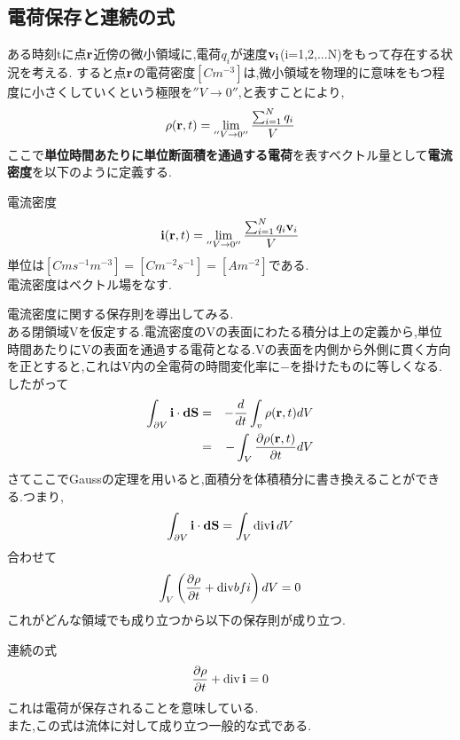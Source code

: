 \documentclass{jsarticle}
\begin{document}
\subsection{電荷保存と連続の式}
ある時刻tに点${\bf r}$近傍の微小領域に,電荷$q_i$が速度${\bf v_i}$(i=1,2,...N)をもって存在する状況を考える.
すると点${\bf r}$の電荷密度$[Cm^{-3}]$は,微小領域を物理的に意味をもつ程度に小さくしていくという極限を$''V \to 0''$,と表すことにより,
\begin{eqnarray*}
\rho({\bf r},t) = \lim_{''V \to 0''} \frac{\sum_{i=1}^{N}q_i}{V}
\end{eqnarray*}
ここで{\bf 単位時間あたりに単位断面積を通過する電荷}を表すベクトル量として{\bf 電流密度}を以下のように定義する.
\begin{itembox}[c]{電流密度}
\begin{eqnarray}
{\bf i}({\bf r},t) = \lim_{''V \to 0''} \frac{\sum_{i=1}^{N}q_i{\bf v}_i}{V}
\end{eqnarray}
単位は$[Cms^{-1}m^{-3}]=[Cm^{-2}s^{-1}]=[Am^{-2}]$である. \\
電流密度はベクトル場をなす.
\end{itembox}
電流密度に関する保存則を導出してみる. \\
ある閉領域Vを仮定する.電流密度のVの表面にわたる積分は上の定義から,単位時間あたりにVの表面を通過する電荷となる.Vの表面を内側から外側に貫く方向を正とすると,これはV内の全電荷の時間変化率に$-$を掛けたものに等しくなる.したがって \\
\begin{eqnarray*}
\int_{\partial V}^{}{\bf i} \cdot {\bf dS} &=& - \frac{d}{dt} \int_{v}^{} \rho({\bf r},t) dV \\
&=& - \int_{V}^{} \frac{\partial \rho({\bf r},t)}{\partial t} dV
\end{eqnarray*}
さてここでGaussの定理を用いると,面積分を体積積分に書き換えることができる.つまり,
\begin{eqnarray*}
\int_{\partial V}^{}{\bf i} \cdot {\bf dS} = \int_{V}^{} {\rm div}{\bf i}\, dV
\end{eqnarray*}
合わせて
\begin{eqnarray*}
\int_{V}^{} \left( \frac{\partial \rho}{\partial t} + {\rm div}{bf i} \right) dV = 0
\end{eqnarray*}
これがどんな領域でも成り立つから以下の保存則が成り立つ.
\begin{itembox}[c]{連続の式}
\begin{eqnarray}
\frac{\partial \rho}{\partial t} + {\rm div}\,{\bf i} = 0
\end{eqnarray}
これは電荷が保存されることを意味している. \\
また,この式は流体に対して成り立つ一般的な式である.
\end{itembox}
\end{document}
